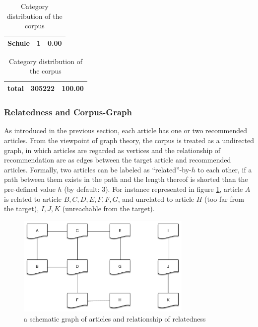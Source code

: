 \begin{description}
\begin{table}[!htb]
\begin{minipage}{.45\linewidth}
\begin{tabular}{rrr}
         Schule       &          1 &             0.00 \\
        \hline
        \end{tabular}
        \end{minipage}
        \begin{minipage}{1\linewidth}
        \centering
        \begin{tabular}{rrr}
        \\
        \textbf{total} &  305222 & 100.00 \\
        \hline
        \end{tabular}
        \end{minipage}
        \caption{Category distribution of the corpus}
        \label{tab:cate_dist}
        \end{table}
        
\end{description}

\subsubsection{Relatedness and Corpus-Graph}

As introduced in the previous section, each article has one or two recommended articles. From the viewpoint of graph theory, the corpus is treated as a undirected graph, in which articles are regarded as vertices and the relationship of recommendation are as edges between the target article and recommended articles. Formally, two articles can be labeled as ``related''-by-$h$ to each other, if a path between them exists in the path and the length thereof is shorted than the pre-defined value $h$ (by default: 3). For instance represented in figure \ref{fig:relatedness}, article $A$ is related to article $B, C, D, E, F, F, G$, and unrelated to  article $H$ (too far from the target), $I, J, K$ (unreachable from the target). 
 
\begin{figure}[!htb]
    \centering
    \includegraphics[width=0.75\textwidth]{fig/relatedness.pdf}
    \caption{a schematic graph of articles and relationship of relatedness}
    \label{fig:relatedness}
\end{figure}


